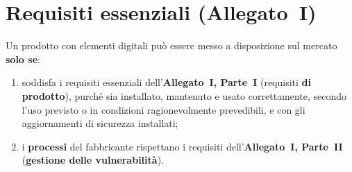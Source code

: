 \section{Requisiti essenziali (Allegato~I)}
\label{sec:cra-allegato1}

Un prodotto con elementi digitali può essere messo a disposizione sul mercato \textbf{solo se}:
\begin{enumerate}
  \item soddisfa i requisiti essenziali dell'\textbf{Allegato~I, Parte~I} (requisiti \textbf{di
    prodotto}), purché sia installato, mantenuto e usato correttamente, secondo l'uso previsto o in
    condizioni ragionevolmente prevedibili, e con gli aggiornamenti di sicurezza installati;
  \item i \textbf{processi} del fabbricante rispettano i requisiti dell'\textbf{Allegato~I, Parte~II}
    (\textbf{gestione delle vulnerabilità}).
\end{enumerate}

